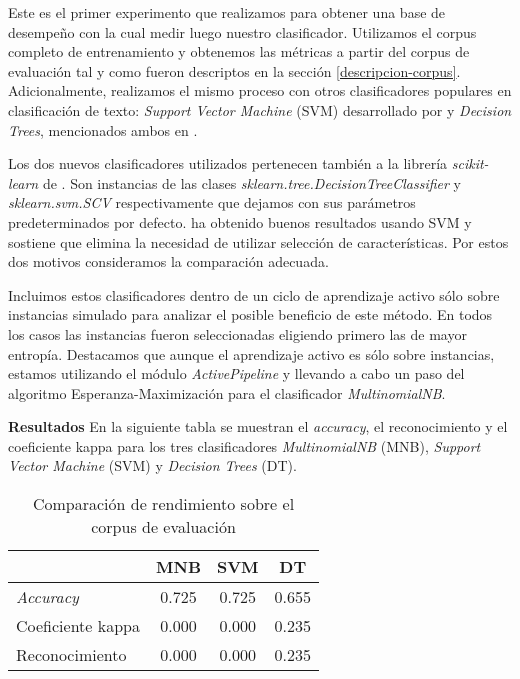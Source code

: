 Este es el primer experimento que realizamos para obtener una base de desempeño con la cual medir luego nuestro clasificador. Utilizamos el corpus completo de entrenamiento y obtenemos las métricas a partir del corpus de evaluación tal y como fueron descriptos en la sección \ref{descripcion-corpus}.
Adicionalmente, realizamos el mismo proceso con otros clasificadores populares en clasificación de texto: \textit{Support Vector Machine} (SVM) desarrollado por \citet{svm-cortes} y \textit{Decision Trees}, mencionados ambos en \citet{Sebastiani-text-categorization}.

Los dos nuevos clasificadores utilizados pertenecen también a la librería \textit{scikit-learn} de \citet{scikit-learn}. Son instancias de las clases \textit{sklearn.tree.DecisionTreeClassifier} y \textit{sklearn.svm.SCV} respectivamente que dejamos con sus parámetros predeterminados por defecto. \citet{svm-uso-Joachims} ha obtenido buenos resultados usando SVM y sostiene que elimina la necesidad de utilizar selección de características. Por estos dos motivos consideramos la comparación adecuada.

Incluimos estos clasificadores dentro de un ciclo de aprendizaje activo sólo sobre instancias simulado para analizar el posible beneficio de este método. En todos los casos las instancias fueron seleccionadas eligiendo primero las de mayor entropía. Destacamos que aunque el aprendizaje activo es sólo sobre instancias, estamos utilizando el módulo \textit{ActivePipeline} y llevando a cabo un paso del algoritmo Esperanza-Maximización para el clasificador \textit{MultinomialNB}.

\vspace{3 mm}

\textbf{Resultados} En la siguiente tabla se muestran el \textit{accuracy}, el reconocimiento y el coeficiente kappa para los tres clasificadores \textit{MultinomialNB} (MNB), \textit{Support Vector Machine} (SVM) y \textit{Decision Trees} (DT).

\begin{table}[h]
\centering
\begin{tabular}{l c c c}
     & MNB & SVM & DT\\ [0.5ex]
    \hline
    \textit{Accuracy} & 0.725 & 0.725 & 0.655 \\ [0.5ex]
    Coeficiente kappa & 0.000 & 0.000 & 0.235 \\ [0.5ex]
    Reconocimiento & 0.000 & 0.000 & 0.235 \\[1ex]
    \hline
\end{tabular}
\caption{Comparación de rendimiento sobre el corpus de evaluación}
\end{table}

